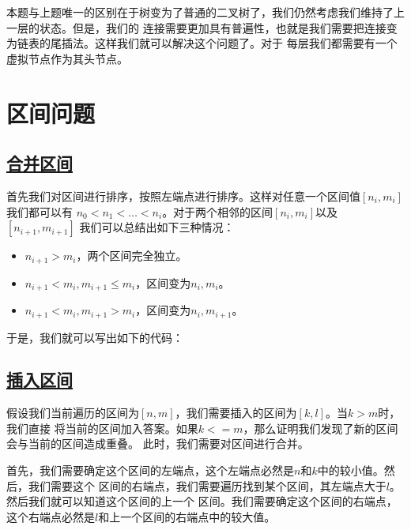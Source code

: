 \documentclass[../../main.tex]{subfiles}
\begin{document}
本题与上题唯一的区别在于树变为了普通的二叉树了，我们仍然考虑我们维持了上一层的状态。但是，我们的
连接需要更加具有普遍性，也就是我们需要把连接变为链表的尾插法。这样我们就可以解决这个问题了。对于
每层我们都需要有一个虚拟节点作为其头节点。



\section{区间问题}

\subsection{\href{https://leetcode.cn/problems/merge-intervals/}{合并区间}}

首先我们对区间进行排序，按照左端点进行排序。这样对任意一个区间值$[n_{i}, m_{i}]$我们都可以有
$n_{0} < n_{1} < \dots < n_{i}$。对于两个相邻的区间$[n_{i}, m_{i}]$以及$[n_{i + 1}, m_{i + 1}]$
我们可以总结出如下三种情况：

\begin{itemize}
  \item $n_{i + 1} > m_{i}$，两个区间完全独立。
  \item $n_{i + 1} < m_{i}, m_{i + 1} \leq m_{i}$，区间变为$n_{i}, m_{i}$。
  \item $n_{i + 1} < m_{i}, m_{i + 1} > m_{i}$，区间变为$n_{i}, m_{i + 1}$。
\end{itemize}

于是，我们就可以写出如下的代码：



\subsection{\href{https://leetcode.cn/problems/insert-interval/}{插入区间}}

假设我们当前遍历的区间为$[n, m]$，我们需要插入的区间为$[k, l]$。当$k > m$时，我们直接
将当前的区间加入答案。如果$k <= m$，那么证明我们发现了新的区间会与当前的区间造成重叠。
此时，我们需要对区间进行合并。

首先，我们需要确定这个区间的左端点，这个左端点必然是$n$和$k$中的较小值。然后，我们需要这个
区间的右端点，我们需要遍历找到某个区间，其左端点大于$l$。然后我们就可以知道这个区间的上一个
区间。我们需要确定这个区间的右端点，这个右端点必然是$l$和上一个区间的右端点中的较大值。
\end{document}
